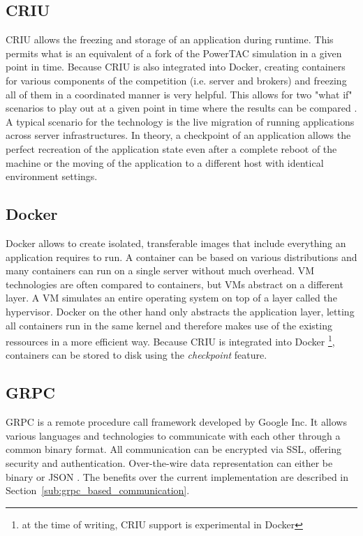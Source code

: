 \subsection{CRIU}%
\label{sub:criu}
\ac{CRIU} allows the freezing and storage of an application during runtime. This permits what is an equivalent of a fork
of the \ac {PowerTAC} simulation in a given point in time. Because \ac{CRIU} is also integrated into Docker, creating
containers for various components of the competition (i.e. server and brokers) and freezing all of them in a coordinated
manner is very helpful. This allows for two "what if" scenarios to play out at a given point in time where the results
can be compared \citep{criu}. A typical scenario for the technology is the live migration of running applications across
server infrastructures. In theory, a checkpoint of an application allows the perfect recreation of the application state
even after a complete reboot of the machine or the moving of the application to a different host with identical
environment settings.

\subsection{Docker}
\label{sub:docker}


Docker allows to create isolated, transferable images that include everything an application requires to run. A
container can be based on various distributions and many containers can run on a single server without much overhead.
\ac{VM} technologies are often compared to containers, but \ac{VM}s abstract on a different layer. A \ac{VM} simulates
an entire operating system on top of a layer called the hypervisor. Docker on the other hand only abstracts the
application layer, letting all containers run in the same kernel and therefore makes use of the existing ressources in a
more efficient way. Because \ac{CRIU} is integrated into Docker
\footnote{at the time of writing, CRIU support is experimental in Docker},
containers can be stored to disk using the \emph{checkpoint} feature.

\subsection{\ac {GRPC}}%
\label{sub:grpc}

\acf {GRPC} is a remote procedure call framework developed by Google Inc. It allows various languages and technologies to
communicate with each other through a common binary format. All communication can be encrypted via SSL, offering
security and authentication. Over-the-wire data representation can either be binary or \ac{JSON}
\citep[]{grpc}. The benefits over the
current implementation are described in Section~\ref{sub:grpc_based_communication}.


